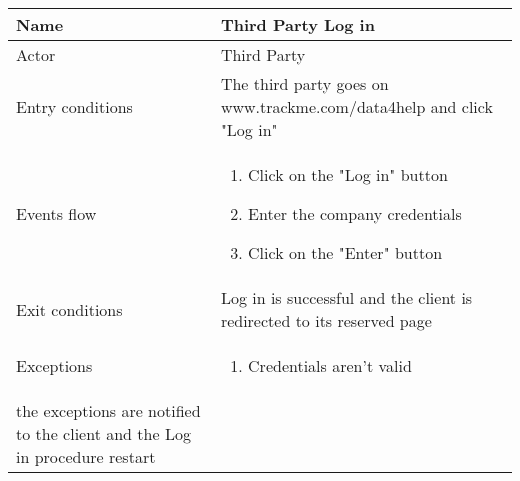 \begin{table}[]
\begin{tabular}{|l|l|}
\hline
Name             & Third Party Log in \\ \hline
Actor            & Third Party \\ \hline
Entry conditions & The third party goes on www.trackme.com/data4help and click "Log in" \\ \hline
Events flow      & \begin{enumerate}
\item Click on the "Log in" button
\item Enter the company credentials
\item Click on the "Enter" button
\end{enumerate} \\ \hline
Exit conditions  & Log in is successful and the client is redirected to its reserved page  \\ \hline
Exceptions       & \begin{enumerate}
\item Credentials aren't valid
\end{enumerate} \\ the exceptions are notified to the client and the Log in procedure restart  \hline
\end{tabular}
\end{table}

